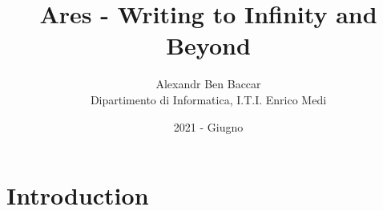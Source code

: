 \documentclass{article}
\title{Ares - Writing to Infinity and Beyond}
\date{2021 - Giugno}
\author{Alexandr Ben Baccar\\ Dipartimento di Informatica, I.T.I. Enrico Medi}
\begin{document}
    \maketitle
    \section{Introduction}
    \label{sec: introduction}
    \blindtext
\end{document}
